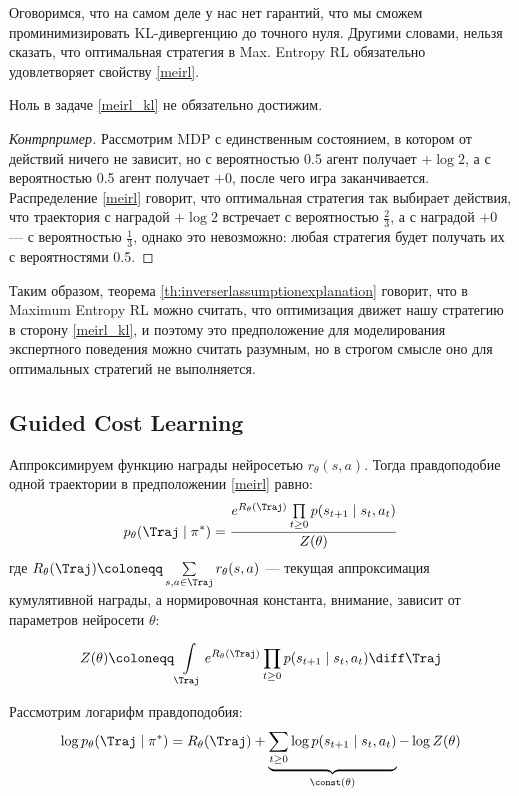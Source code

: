 Оговоримся, что на самом деле у нас нет гарантий, что мы сможем проминимизировать KL-дивергенцию до точного нуля. Другими словами, нельзя сказать, что оптимальная стратегия в Max. Entropy RL обязательно удовлетворяет свойству \eqref{meirl}.

\begin{proposition}
Ноль в задаче \eqref{meirl_kl} не обязательно достижим.
\begin{proof}[Контрпример]
Рассмотрим MDP с единственным состоянием, в котором от действий ничего не зависит, но с вероятностью 0.5 агент получает $+\log 2$, а с вероятностью 0.5 агент получает $+0$, после чего игра заканчивается. Распределение \eqref{meirl} говорит, что оптимальная стратегия так выбирает действия, что траектория с наградой $+\log 2$ встречает с вероятностью $\frac{2}{3}$, а с наградой $+0$ --- с вероятностью $\frac{1}{3}$, однако это невозможно: любая стратегия будет получать их с вероятностями 0.5.
\end{proof}
\end{proposition}

Таким образом, теорема \ref{th:inverserlassumptionexplanation} говорит, что в Maximum Entropy RL можно считать, что оптимизация движет нашу стратегию в сторону \eqref{meirl_kl}, и поэтому это предположение для моделирования экспертного поведения можно считать разумным, но в строгом смысле оно для оптимальных стратегий не выполняется.

\subsection{Guided Cost Learning}

Аппроксимируем функцию награды нейросетью $r_\theta(s, a)$. Тогда правдоподобие одной траектории в предположении \eqref{meirl} равно:
$$p_\theta(\Traj \mid \pi^*) = \frac{e^{R_{\theta}(\Traj)} \prod\limits_{t \ge 0}p(s_{t+1} \mid s_t, a_t)}{Z(\theta)}$$
где $R_{\theta}(\Traj) \coloneqq \sum\limits_{s, a \in \Traj} r_{\theta}(s, a)$ --- текущая аппроксимация кумулятивной награды, а нормировочная константа, внимание, зависит от параметров нейросети $\theta$:

\begin{equation}\label{irl_partionfunction}
Z(\theta) \coloneqq \int\limits_{\Traj} e^{R_{\theta}(\Traj)} \prod_{t \ge 0}p(s_{t+1} \mid s_t, a_t) \diff \Traj
\end{equation}

Рассмотрим логарифм правдоподобия:
\begin{equation}\label{irl_loglikelihood}
\log p_\theta(\Traj \mid \pi^*) = R_{\theta}(\Traj) + \underbrace{\sum_{t \ge 0} \log p(s_{t+1} \mid s_t, a_t)}_{\const(\theta)} - \log Z(\theta)
\end{equation}

